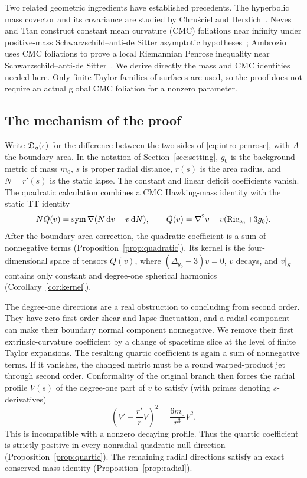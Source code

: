 Two related geometric ingredients have established precedents.
The hyperbolic mass covector and its covariance are studied by
Chru\'sciel and Herzlich~\cite{ChruscielHerzlich2003}.
Neves and Tian construct constant mean curvature (CMC) foliations near
infinity under
positive-mass Schwarzschild--anti-de Sitter asymptotic
hypotheses~\cite{NevesTian2009}; Ambrozio uses CMC foliations to prove
a local Riemannian Penrose inequality near
Schwarzschild--anti-de Sitter~\cite{Ambrozio2015}.
We derive directly the mass and CMC identities needed here.
Only finite Taylor families of surfaces are used, so the proof
does not require an actual global CMC foliation for a nonzero
parameter.

\subsection*{The mechanism of the proof}

Write $\mathfrak D_q(\epsilon)$ for the difference between the two
sides of \eqref{eq:intro-penrose}, with $A$ the boundary area.
In the notation of Section~\ref{sec:setting}, $g_0$ is the background
metric of mass $m_0$, $s$ is proper radial distance, $r(s)$ is the
area radius, and $N=r'(s)$ is the static lapse.
The constant and linear deficit coefficients vanish. The quadratic
calculation combines a CMC
Hawking-mass identity with the static TT identity
\[
 NQ(v)=\operatorname{sym}\nabla(N\,\mathrm{d} v-v\,\mathrm{d} N),
 \qquad Q(v)=\nabla^2v-v(\operatorname{Ric}_{g_0}+3g_0).
\]
After the boundary area correction, the quadratic coefficient is a
sum of nonnegative terms (Proposition~\ref{prop:quadratic}). Its kernel
is the four-dimensional space of tensors $Q(v)$, where
$(\Delta_{g_0}-3)v=0$, $v$ decays, and $v|_S$ contains only constant
and degree-one spherical harmonics (Corollary~\ref{cor:kernel}).

The degree-one directions are a real obstruction to concluding from
second order. They have zero first-order shear and lapse fluctuation,
and a radial component can make their boundary normal component
nonnegative. We remove their first extrinsic-curvature coefficient
by a change of spacetime slice at the level of finite Taylor expansions. The
resulting quartic coefficient is again a sum of nonnegative terms.
If it vanishes, the changed metric must be a round warped-product
jet through second order. Conformality of the original branch then
forces the radial profile $V(s)$ of the degree-one part of $v$ to satisfy
(with primes denoting $s$-derivatives)
\[
 \left(V'-\frac{r'}rV\right)^2=\frac{6m_0}{r^3}V^2.
\]
This is incompatible with a nonzero decaying profile. Thus the
quartic coefficient is strictly positive in every nonradial
quadratic-null direction (Proposition~\ref{prop:quartic}). The remaining
radial directions satisfy an exact conserved-mass identity
(Proposition~\ref{prop:radial}).

